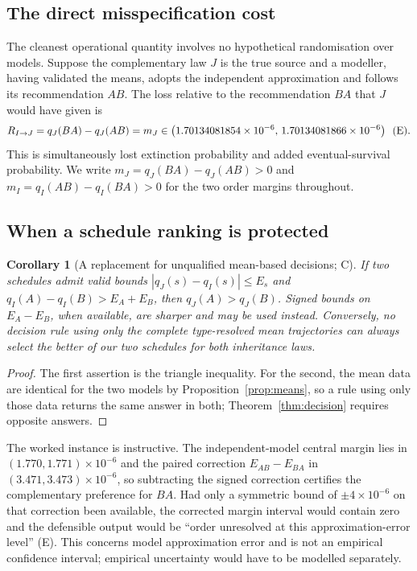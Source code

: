 \documentclass[11pt]{article}
\newtheorem{corollary}[theorem]{Corollary}
\theoremstyle{remark}
\begin{document}
\subsection{The direct misspecification cost}
The cleanest operational quantity involves no hypothetical randomisation over
models. Suppose the complementary law $J$ is the true source and a modeller,
having validated the means, adopts the independent approximation and follows its
recommendation $AB$. The loss relative to the recommendation $BA$ that $J$ would
have given is
\begin{equation}
 R_{I\to J}=q_J(BA)-q_J(AB)=m_J\in
 \bigl(1.70134081854\times10^{-6},\,1.70134081866\times10^{-6}\bigr)\ \ \text{\textup{(E)}}.
 \label{eq:direct}
\end{equation}
This is simultaneously lost extinction probability and added eventual-survival
probability. We write $m_J=q_J(BA)-q_J(AB)>0$ and $m_I=q_I(AB)-q_I(BA)>0$ for the
two order margins throughout.

\subsection{When a schedule ranking is protected}
\begin{corollary}[A replacement for unqualified mean-based decisions; C]
\label{cor:criterion}
If two schedules admit valid bounds $|q_J(s)-q_I(s)|\le E_s$ and
$q_I(A)-q_I(B)>E_A+E_B$, then $q_J(A)>q_J(B)$. Signed bounds on $E_A-E_B$, when
available, are sharper and may be used instead. Conversely, no decision rule
using only the complete type-resolved mean trajectories can always select the
better of our two schedules for both inheritance laws.
\end{corollary}

\begin{proof}
The first assertion is the triangle inequality. For the second, the mean data are
identical for the two models by Proposition~\ref{prop:means}, so a rule using only
those data returns the same answer in both; Theorem~\ref{thm:decision} requires
opposite answers.
\end{proof}

The worked instance is instructive. The independent-model central margin lies in
$(1.770,1.771)\times10^{-6}$ and the paired correction $E_{AB}-E_{BA}$ in
$(3.471,3.473)\times10^{-6}$, so subtracting the signed correction certifies the
complementary preference for $BA$. Had only a symmetric bound of
$\pm4\times10^{-6}$ on that correction been available, the corrected margin
interval would contain zero and the defensible output would be ``order
unresolved at this approximation-error level'' \textup{(E)}. This concerns model
approximation error and is not an empirical confidence interval; empirical
uncertainty would have to be modelled separately.
\end{document}
